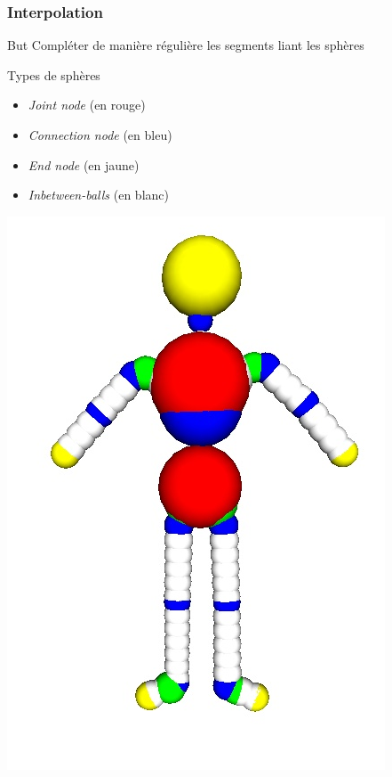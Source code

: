\documentclass[9pt]{beamer}
\begin{document}
\begin{frame}
	\frametitle{Interpolation}
	\begin{block}{But}
		Compléter de manière régulière les segments liant les sphères
	\end{block}
	\begin{block} {Types de sphères}
		\begin{itemize}
			\item \textit{Joint node} (en rouge)
			\item \textit{Connection node} (en bleu)
			\item \textit{End node} (en jaune)
			\item \textit{Inbetween-balls} (en blanc)
		\end{itemize}
	\end{block}
	\begin{center}
	\includegraphics[scale=0.27]{images/bonhomme_interpole.png}
	\end{center}
\end{frame}
\end{document}
